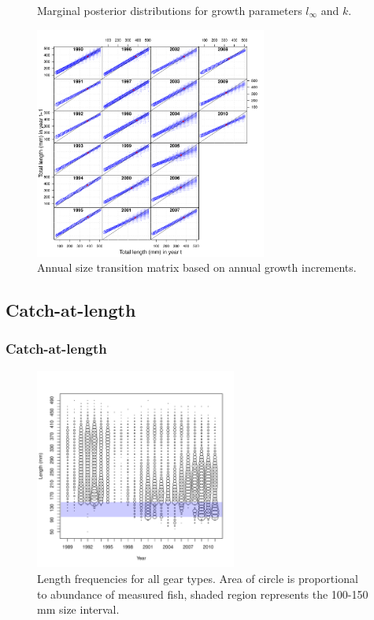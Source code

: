 \documentclass{beamer}
\begin{document}
\begin{frame}
{\begin{figure}[htbp]
			\caption{Marginal posterior distributions for growth parameters $l_\infty$ and $k$.}
			\label{fig:FIGS_LSMR_fig:LinfPosteriors}
		\end{figure}
	}
	{
		\begin{figure}[htbp]
			\centering
				\includegraphics[height=3in]{../../FIGS/LSMR/fig:TransitionMatrix.pdf}
			\caption{Annual size transition matrix based on annual growth increments.}
			\label{fig:FIGS_LSMR_fig:TransitionMatrix}
		\end{figure}	
	}
\end{frame}

\subsection{Catch-at-length} %
\label{sub:catch_at_length}
\begin{frame}
	\frametitle{Catch-at-length}
	\begin{figure}[htbp]
		\centering
			\includegraphics[height=2.6in]{../../FIGS/LSMR/fig:CaptureLFbubbles.pdf}
		\caption{Length frequencies for all gear types. Area of circle is proportional to abundance of measured fish, shaded region represents the 100-150 mm size interval.}
		\label{fig:FIGS_LSMR_fig:CaptureLFbubbles}
	\end{figure}
\end{frame}
\end{document}
